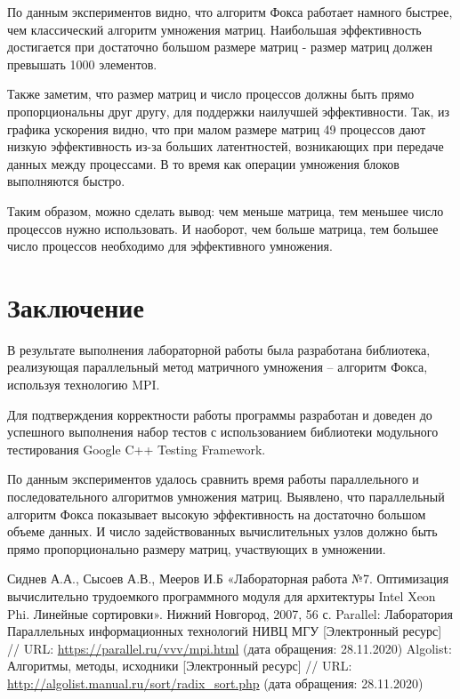\documentclass{report}
\begin{document}
\par По данным экспериментов видно, что алгоритм Фокса работает намного быстрее, чем классический алгоритм умножения матриц. Наибольшая эффективность достигается при достаточно большом размере матриц - размер матриц должен превышать 1000 элементов.
\par Также заметим, что размер матриц и число процессов должны быть прямо пропорциональны друг другу, для поддержки наилучшей эффективности. Так, из графика ускорения видно, что при малом размере матриц 49 процессов дают низкую эффективность из-за больших латентностей, возникающих при передаче данных между процессами. В то время как операции умножения блоков выполняются быстро. 
\par Таким образом, можно сделать вывод: чем меньше матрица, тем меньшее число процессов нужно использовать. И наоборот, чем больше матрица, тем большее число процессов необходимо для эффективного умножения.
\newpage

\section*{Заключение}
В результате выполнения лабораторной работы была разработана библиотека, реализующая параллельный метод матричного умножения – алгоритм Фокса, используя технологию MPI.
\par Для подтверждения корректности работы программы разработан и доведен до успешного выполнения набор тестов с использованием библиотеки модульного тестирования Google C++ Testing Framework.
\par По данным экспериментов удалось сравнить время работы параллельного и последовательного алгоритмов умножения матриц. Выявлено, что параллельный алгоритм Фокса показывает высокую эффективность на достаточно большом объеме данных. И число задействованных вычислительных узлов должно быть прямо пропорционально размеру матриц, участвующих в умножении. 
\newpage

\begin{thebibliography}{1}
	 Сиднев А.А., Сысоев А.В., Мееров И.Б «Лабораторная работа №7. Оптимизация вычислительно трудоемкого программного модуля для архитектуры Intel Xeon Phi. Линейные сортировки». Нижний Новгород, 2007, 56 с. 
	 Parallel: Лаборатория Параллельных информационных технологий НИВЦ МГУ [Электронный ресурс] // URL: \url {https://parallel.ru/vvv/mpi.html} (дата обращения: 28.11.2020)
	 Algolist: Алгоритмы, методы, исходники [Электронный ресурс] // URL: \url {http://algolist.manual.ru/sort/radix_sort.php} (дата обращения: 28.11.2020)
\end{thebibliography}
\newpage
\end{document}
